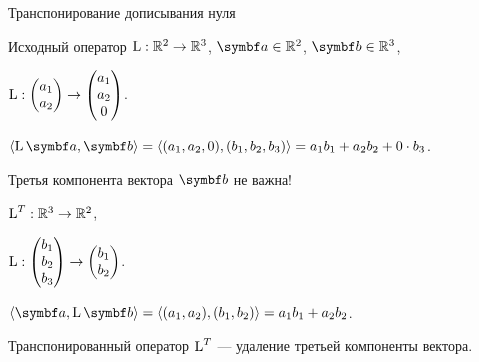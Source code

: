 \begin{frame}{Транспонирование дописывания нуля}


Исходный оператор $\operatorname{L}: \mathbb{R}^2 \to \mathbb{R}^3$, $\ba \in \R^2$, $\bb\in \R^3$,

$\operatorname{L}: \begin{pmatrix}
    a_1 \\
    a_2 \\
\end{pmatrix} \to \begin{pmatrix}
    a_1 \\
    a_2 \\
    0 \\
\end{pmatrix}$.
\pause

$\langle \LL \ba , \bb \rangle = \langle (a_1, a_2, 0) , (b_1, b_2, b_3) \rangle = 
 a_1 b_1 + a_2 b_2 + 0 \cdot b_3$.
\pause


Третья компонента вектора $\bb$ не важна!
\pause

$\operatorname{L}^T  : \mathbb{R}^3 \to \mathbb{R}^2$,

$\operatorname{L}: \begin{pmatrix}
    b_1 \\
    b_2 \\
    b_3
\end{pmatrix} \to \begin{pmatrix}
    b_1 \\
    b_2 \\
\end{pmatrix}$.
\pause

$\langle \ba , \LL \bb \rangle = \langle (a_1, a_2) , (b_1, b_2) \rangle =  a_1 b_1 + a_2 b_2$.
\pause

Транспонированный оператор $\operatorname{L}^T$ — удаление третьей компоненты вектора.

\end{frame}
    

